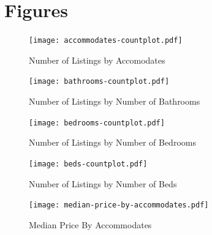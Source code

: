 

\section{Figures}

\begin{figure}[H] \centering
    \texttt{[image: accommodates-countplot.pdf]}
    \caption{Number of Listings by Accomodates}
    \label{fig:accommodates-countplot}
\end{figure}

\begin{figure}[H] \centering
    \texttt{[image: bathrooms-countplot.pdf]}
    \caption{Number of Listings by Number of Bathrooms }
    \label{fig:bathrooms-countplot}
\end{figure}

\begin{figure}[H] \centering
    \texttt{[image: bedrooms-countplot.pdf]}
    \caption{Number of Listings by Number of Bedrooms }
    \label{fig:bedrooms-countplot}
\end{figure}

\begin{figure}[H] \centering
    \texttt{[image: beds-countplot.pdf]}
    \caption{Number of Listings by Number of Beds }
    \label{fig:beds-countplot}
\end{figure}

\begin{figure}[H] \centering
    \texttt{[image: median-price-by-accommodates.pdf]}
    \caption{Median Price By Accommodates}
    \label{fig:median-price-by-accommodates}
\end{figure}

